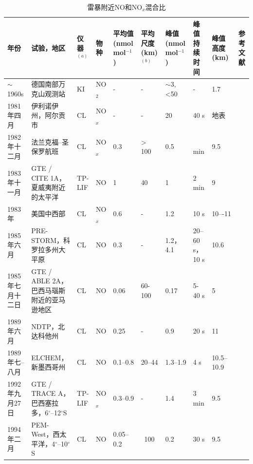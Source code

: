 \clearpage
{
\centering
\scriptsize
\begin{longtable}
{|p{3em}|p{5.2em}|p{3.3em}|p{2em}|p{5.5em}|p{4em}|p{5.5em}|p{4em}|p{4em}|p{4.4em}|}
\caption{雷暴附近NO和NO$_x$混合比}
\label{table:NO/NOx} \\
\hline
年份 & 试验，地区  & 仪器$^{(a)}$  & 物种 & 平均值 (nmol mol$^{−1}$) &
平均尺度 (km) $^{(b)}$  &  峰值 \newline(nmol mol$^{−1}$)  &  峰值 \newline 持续时间  & 峰值高度(km) &   参考文献 \\ \hline
$\sim$1960s & 德国南部万克山观测站              & KI     & NO$_2$ & -   &  -    &  $\sim$3, <50  & -    & 1.7   &  \citet{Reiter.1970} \\ \hline
1981年四月   & 伊利诺伊州，阿尔贡市              & CL     & NO$_x$ & -   &  -    &  20            & 40 s  & 地表  &  \citet{Drapcho.1983} \\ \hline
1982年十二月 & 法兰克福–圣保罗航班               & CL     & NO$_x$ & 0.3 & > 100 &  0.5           & ~ min &  9.5 & \citet{Dickerson.1984} \\ \hline
1983年十一月 & GTE / CITE 1A，夏威夷附近的太平洋 & TP-LIF & NO  & 1    & 40    &   1            & 2 min & 9    & \citet{Chameides.1987,Davis.1987} \\ \hline
1983年      & 美国中西部                       & CL     & NO$_x$ & 0.6 & -     & 1.2            & 10 s  & 10–-11 & \citet{Dickerson.1987} \\ \hline
1985年六月   & PRE-STORM，科罗拉多州大平原       & CL     & NO  & 0.3 & -     & 1.2，4.1       & 20--60 s， 10 s &  10.6  &  \citet{Luke.1992} \\ \hline
1985年七月十二日  & GTE / ABLE 2A，巴西马瑙斯附近的亚马逊地区 & CL  & NO  & 0.06 & 60-100 & 0.17  & 5-40 s & 5  & \citet{Torres.1988} \\ \hline
1989年六月   & NDTP，北达科他州                 & CL     & NO  & 0.25  & -   & 0.9            & 20 s   &  11  & \citet{Poulida.1996} \\ \hline
1989年七--八月 &  ELCHEM，新墨西哥州            & CL      & NO  & 0.1--0.8 & 20--44  & 1.3--1.9 & 4 s  & 10.5--10.9   & \citet{Ridley.1996} \\ \hline
1992年九月27日  & GTE / TRACE A，巴西塞拉多，6$^{\circ}$--12$^{\circ}$S & TP-LIF & NO$_x$ & 0.3--0.9 & - &  1.4 & 3 min  & 9.5 & \citet{Pickering.1996} \\ \hline
1994年二月    & PEM-West，西太平洋，4$^{\circ}$--10$^{\circ}$S & CL  &  NO  & 0.05--0.2 &~100 & 0.2 & 30 s  &  9.5 & \citet{Kawakami.1997} \\ \hline

\end{longtable}}
